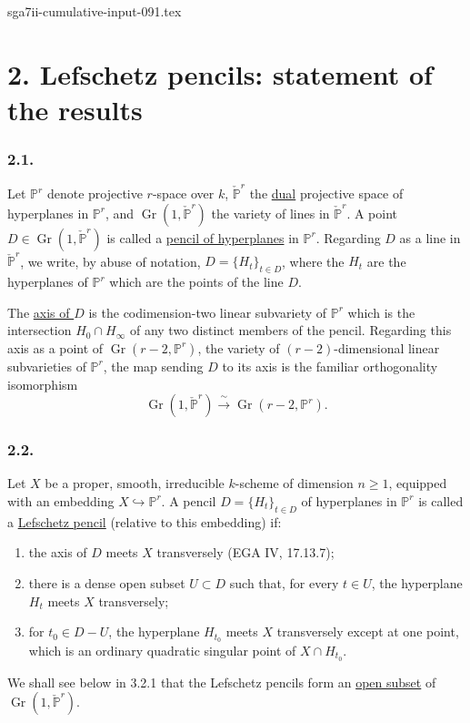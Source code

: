 \begin{filecontents*}{sga7ii-cumulative-input-091.tex}
\section*{2. Lefschetz pencils: statement of the results}

\subsubsection*{2.1.}
Let $\mathbb P^r$ denote projective $r$-space over $k$,
$\check{\mathbb P}^{r}$ the \underline{dual} projective space of
hyperplanes in $\mathbb P^r$, and
$\operatorname{Gr}(1,\check{\mathbb P}^{r})$ the variety of lines in
$\check{\mathbb P}^{r}$.  A point
$D\in\operatorname{Gr}(1,\check{\mathbb P}^{r})$ is called a
\underline{pencil of hyperplanes} in $\mathbb P^r$.  Regarding $D$ as
a line in $\check{\mathbb P}^{r}$, we write, by abuse of notation,
$D=\{H_t\}_{t\in D}$, where the $H_t$ are the hyperplanes of
$\mathbb P^r$ which are the points of the line $D$.

The \underline{axis of $D$} is the codimension-two linear subvariety
of $\mathbb P^r$ which is the intersection $H_0\cap H_\infty$ of any
two distinct members of the pencil.  Regarding this axis as a point
of $\operatorname{Gr}(r-2,\mathbb P^r)$, the variety of
$(r-2)$-dimensional linear subvarieties of $\mathbb P^r$, the map
sending $D$ to its axis is the familiar orthogonality isomorphism
\[
\operatorname{Gr}(1,\check{\mathbb P}^{r})
\xrightarrow{\ \sim\ }
\operatorname{Gr}(r-2,\mathbb P^r).
\]

\subsubsection*{2.2.}
Let $X$ be a proper, smooth, irreducible $k$-scheme of dimension
$n\geq1$, equipped with an embedding $X\hookrightarrow\mathbb P^r$.
A pencil $D=\{H_t\}_{t\in D}$ of hyperplanes in $\mathbb P^r$ is
called a \underline{Lefschetz pencil} (relative to this embedding) if:
\begin{enumerate}
\item[(a)] the axis of $D$ meets $X$ transversely (EGA IV, 17.13.7);
\item[(b)] there is a dense open subset $U\subset D$ such that, for
every $t\in U$, the hyperplane $H_t$ meets $X$ transversely;
\item[(c)] for $t_0\in D-U$, the hyperplane $H_{t_0}$ meets $X$
transversely except at one point, which is an ordinary quadratic
singular point of $X\cap H_{t_0}$.
\end{enumerate}
We shall see below in 3.2.1 that the Lefschetz pencils form an
\underline{open subset} of
$\operatorname{Gr}(1,\check{\mathbb P}^{r})$.


\end{filecontents*}

